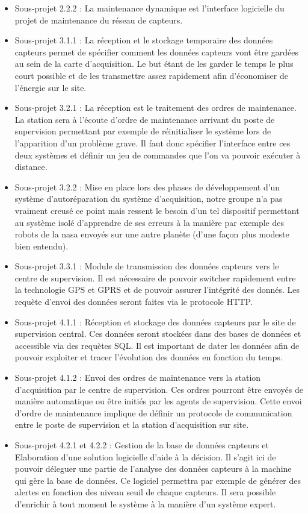 \begin{itemize}
\item Sous-projet 2.2.2 : La maintenance dynamique est l'interface logicielle du projet de maintenance du réseau de capteurs.
\medskip
\item Sous-projet 3.1.1 : La réception et le stockage temporaire des données capteurs permet de spécifier comment les données capteurs vont être gardées au sein de la carte d'acquisition. Le but étant de les garder le temps le plus court possible et de les transmettre assez rapidement afin d'économiser de l'énergie sur le site.
\item Sous-projet 3.2.1 : La réception est le traitement des ordres de maintenance. La station sera à l'écoute d'ordre de maintenance arrivant du poste de supervision permettant par exemple de réinitialiser le système lors de l'apparition d'un problème grave. Il faut donc spécifier l'interface entre ces deux systèmes et définir un jeu de commandes que l'on va pouvoir exécuter à distance.
\item Sous-projet 3.2.2 : Mise en place lors des phases de développement d'un système d'\og autoréparation du système d'acquisition, notre groupe n'a pas vraiment creusé ce point mais ressent le besoin d'un tel dispositif permettant au système isolé d'apprendre de ses erreurs à la manière par exemple des robots de la nasa envoyés sur une autre planète (d'une façon plus modeste bien entendu).
\item Sous-projet 3.3.1 : Module de transmission des données capteurs vers le centre de supervision. Il est nécessaire de pouvoir switcher rapidement entre la technologie GPS et GPRS et de pouvoir assurer l'intégrité des donnés. Les requète d'envoi des données seront faites via le protocole HTTP.
\meskip 
\item Sous-projet 4.1.1 : Réception et stockage des données capteurs par le site de supervision central. Ces données seront stockées dans des bases de données et accessible via des requètes SQL. Il est important de dater les données afin de pouvoir exploiter et tracer l'évolution des données en fonction du temps.
\item Sous-projet 4.1.2 : Envoi des ordres de maintenance vers la station d'acquisition par le centre de supervision. Ces ordres pourront être envoyés de manière automatique ou être initiés par les agents de supervision. Cette envoi d'ordre de maintenance implique de définir un protocole de communication entre le poste de supervision et la station d'acquisition sur site.
\item Sous-projet 4.2.1 et 4.2.2 : Gestion de la base de données capteurs et Elaboration d'une solution logicielle d'aide à la décision. Il s'agit ici de pouvoir déleguer une partie de l'analyse des données capteurs à la machine qui gère la base de données. Ce logiciel permettra par exemple de générer des alertes en fonction des niveau seuil de chaque capteurs. Il sera possible d'enrichir à tout moment le système à la manière d'un système expert.

\end{itemize}
